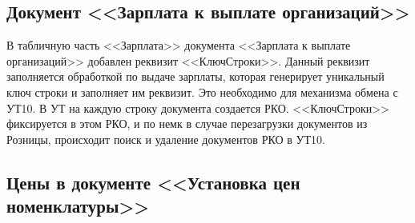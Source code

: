 \subsection{Документ <<Зарплата к выплате организаций>>}\label{1011}	 
В табличную часть <<Зарплата>> документа <<Зарплата к выплате организаций>> добавлен реквизит <<КлючСтроки>>. Данный реквизит заполняется обработкой по выдаче зарплаты, которая генерирует уникальный ключ строки и заполняет им реквизит. Это необходимо для механизма обмена с УТ10. В УТ на каждую строку документа создается РКО. <<КлючСтроки>> фиксируется в этом РКО, и по немк в случае перезагрузки документов из Розницы, происходит поиск и удаление документов РКО в УТ10.

\subsection{Цены в документе <<Установка цен номенклатуры>>}\label{1012}	 
